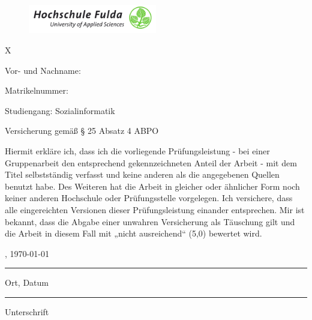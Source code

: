 
\thispagestyle{empty}

\begin{figure}
  \centering
  \includegraphics[width=0.5\textwidth]{res/hs_fulda_logo_ntr.jpg}
\end{figure}

{\color{white} X} %

\vspace{2cm}

Vor- und Nachname: \vorname \nachname

Matrikelnummer: \matrikelnummer

Studiengang: Sozialinformatik

\vspace{1cm}

{\centering\Large Versicherung gemäß § 25 Absatz 4 ABPO \par}


\vspace{0.5cm}
    
Hiermit erkläre ich, dass ich die vorliegende Prüfungsleistung - bei einer Gruppenarbeit den
entsprechend gekennzeichneten Anteil der Arbeit - mit dem
Titel \textbf{\textquote{\titel}}
selbstständig verfasst und keine anderen als die angegebenen Quellen benutzt habe.
Des Weiteren hat die Arbeit in gleicher oder ähnlicher Form noch keiner anderen Hochschule oder
Prüfungsstelle vorgelegen. Ich versichere, dass alle eingereichten Versionen dieser Prüfungsleistung
einander entsprechen.
Mir ist bekannt, dass die Abgabe einer unwahren Versicherung als Täuschung gilt und die Arbeit in
diesem Fall mit „nicht ausreichend“ (5,0) bewertet wird.


\vspace{3cm}

\parbox{6cm}{\centering  \ortderarbeit, \today\hrule\strut\centering\footnotesize Ort, Datum}
\hfill
\vspace{-2cm}
\parbox{6cm}{ \hrule\strut \centering\footnotesize Unterschrift}



